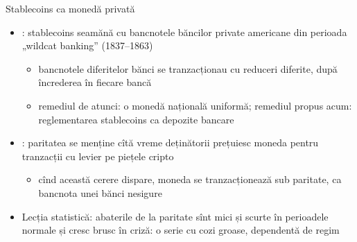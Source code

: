 \begin{frame}{Stablecoins ca monedă privată}
\itemsize{\small}
\begin{itemize}
    \item {}: stablecoins seamănă cu bancnotele băncilor private americane din perioada „wildcat banking” (1837--1863)
    \begin{itemize}
        \item bancnotele diferitelor bănci se tranzacționau cu reduceri diferite, după încrederea în fiecare bancă
        \item remediul de atunci: o monedă națională uniformă; remediul propus acum: reglementarea stablecoins ca depozite bancare
    \end{itemize}
    \item {}: paritatea se menține cîtă vreme deținătorii prețuiesc moneda pentru tranzacții cu levier pe piețele cripto
    \begin{itemize}
        \item cînd această cerere dispare, moneda se tranzacționează sub paritate, ca bancnota unei bănci nesigure
    \end{itemize}
    \item Lecția statistică: abaterile de la paritate sînt mici și scurte în perioadele normale și cresc brusc în criză: o serie cu cozi groase, dependentă de regim
\end{itemize}
\end{frame}


